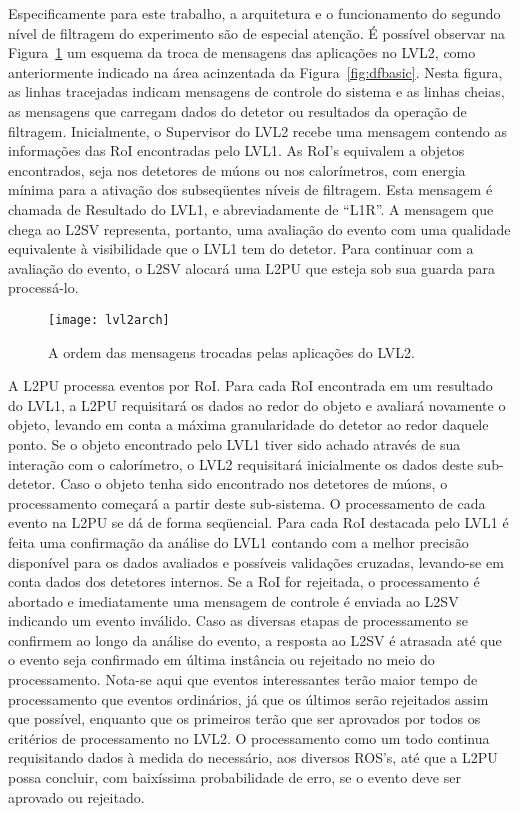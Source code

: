 Especificamente para este trabalho, a arquitetura e o funcionamento do segundo
nível de filtragem do experimento são de especial atenção. É possível observar
na Figura~\ref{fig:lvl2arch} um esquema da troca de mensagens das aplicações
no LVL2, como anteriormente indicado na área acinzentada da
Figura~\ref{fig:dfbasic}. Nesta figura, as linhas tracejadas indicam mensagens
de controle do sistema e as linhas cheias, as mensagens que carregam dados do
detetor ou resultados da operação de filtragem. Inicialmente, o Supervisor do
LVL2 recebe uma mensagem contendo as informações das RoI encontradas pelo
LVL1. As RoI's equivalem a objetos encontrados, seja nos detetores de múons ou
nos calorímetros, com energia mínima para a ativação dos subseqüentes níveis
de filtragem. Esta mensagem é chamada de Resultado do LVL1, e abreviadamente
de ``L1R''. A mensagem que chega ao L2SV representa, portanto, uma avaliação
do evento com uma qualidade equivalente à visibilidade que o LVL1 tem do
detetor. Para continuar com a avaliação do evento, o L2SV alocará uma L2PU que
esteja sob sua guarda para processá-lo.

\begin{figure}
\begin{center}
\texttt{[image: lvl2arch]}
\end{center}
\caption{A ordem das mensagens trocadas pelas aplicações do LVL2.}
\label{fig:lvl2arch}
\end{figure}

A L2PU processa eventos por RoI. Para cada RoI encontrada em um resultado do
LVL1, a L2PU requisitará os dados ao redor do objeto e avaliará novamente o
objeto, levando em conta a máxima granularidade do detetor ao redor daquele
ponto. Se o objeto encontrado pelo LVL1 tiver sido achado através de sua
interação com o calorímetro, o LVL2 requisitará inicialmente os dados deste
sub-detetor. Caso o objeto tenha sido encontrado nos detetores de múons, o
processamento começará a partir deste sub-sistema. O processamento de cada
evento na L2PU se dá de forma seqüencial. Para cada RoI destacada pelo LVL1 é
feita uma confirmação da análise do LVL1 contando com a melhor precisão
disponível para os dados avaliados e possíveis validações cruzadas, levando-se
em conta dados dos detetores internos. Se a RoI for rejeitada, o processamento
é abortado e imediatamente uma mensagem de controle é enviada ao L2SV
indicando um evento inválido. Caso as diversas etapas de processamento se
confirmem ao longo da análise do evento, a resposta ao L2SV é atrasada até que
o evento seja confirmado em última instância ou rejeitado no meio do
processamento. Nota-se aqui que eventos interessantes terão maior tempo de
processamento que eventos ordinários, já que os últimos serão rejeitados assim
que possível, enquanto que os primeiros terão que ser aprovados por todos os
critérios de processamento no LVL2. O processamento como um todo continua
requisitando dados à medida do necessário, aos diversos ROS's, até que a L2PU
possa concluir, com baixíssima probabilidade de erro, se o evento deve ser
aprovado ou rejeitado.

